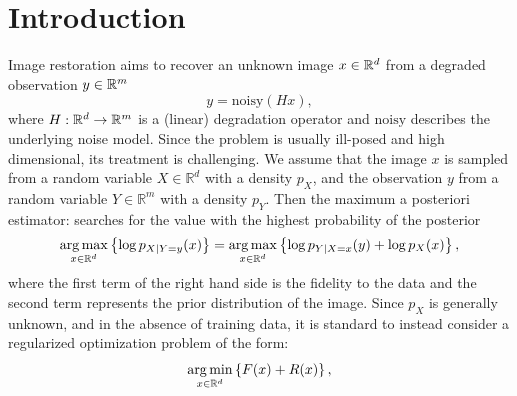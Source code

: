 \documentclass{article} %
\renewcommand{\P}{\mathbb{P}}		%
\theoremstyle{definition}
\begin{document}
\section{Introduction}
Image restoration aims to recover an unknown image $x \in \mathbb{R}^d$ from a degraded observation $y \in \mathbb{R}^m$ 
\begin{equation}
    y = {\mathrm{noisy}}(H x),
\end{equation}
where $H: \mathbb{R}^d \to \mathbb{R}^m$ is a (linear) degradation operator and $\mathrm{noisy}$ describes the underlying noise model.
Since the problem is usually ill-posed and high dimensional, its treatment is challenging. We assume that the image $x$ is sampled from a random variable $X \in \mathbb{R}^d$ with a density $p_X$, and the observation $y$ from a random variable $Y \in \mathbb{R}^m$ with a density $p_Y$.
Then the maximum a posteriori estimator: 
searches for the value with the highest probability of the posterior
\begin{align} \label{eq:generic_MAP}
\operatorname*{arg\,max}_{x \in \mathbb{R}^d} \left\{ \log p_{X|Y=y}(x) \right\} =
\operatorname*{arg\,max}_{x \in \mathbb{R}^d} \left\{ \log p_{Y|X=x}(y) + \log p_{X}(x) \right\},
\end{align}
where the first term of the right hand side is the fidelity to the data and the second term represents the prior distribution of the image. 
Since $p_X$ is generally unknown, and in the absence of training data, it is standard to instead consider a regularized optimization problem of the form:
\begin{equation}\label{eq:min_pb_regularized}
\operatorname*{arg\,min}_{x \in \mathbb{R}^d} \left\{F(x) + R(x)
\right\},
\end{equation}
\end{document}
